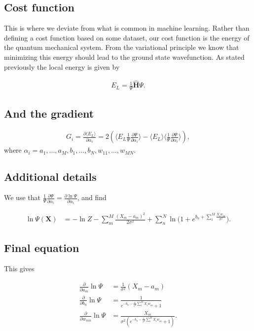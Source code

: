 \documentclass[%
oneside,                 %
final,                   %
10pt]{article}
\begin{document}
\subsection{Cost function}

This is where we deviate from what is common in machine
learning. Rather than defining a cost function based on some dataset,
our cost function is the energy of the quantum mechanical system. From
the variational principle we know that minimizing this energy should
lead to the ground state wavefunction. As stated previously the local
energy is given by

\begin{align*}
	E_L = \frac{1}{\Psi} \hat{\mathbf{H}} \Psi.
\end{align*}

\subsection{And the gradient}

\begin{align*}
	G_i = \frac{\partial \langle E_L \rangle}{\partial \alpha_i}
	= 2(\langle E_L \frac{1}{\Psi}\frac{\partial \Psi}{\partial \alpha_i} \rangle - \langle E_L \rangle \langle \frac{1}{\Psi}\frac{\partial \Psi}{\partial \alpha_i} \rangle ),
\end{align*}
where $\alpha_i = a_1,...,a_M,b_1,...,b_N,w_{11},...,w_{MN}$.

\subsection{Additional details}

We use that $\frac{1}{\Psi}\frac{\partial \Psi}{\partial \alpha_i} 
	= \frac{\partial \ln{\Psi}}{\partial \alpha_i}$,
and find

\begin{align*}
	\ln{\Psi({\mathbf{X}})} &= -\ln{Z} - \sum_m^M \frac{(X_m - a_m)^2}{2\sigma^2}
	+ \sum_n^N \ln({1 + e^{b_n + \sum_i^M \frac{X_i w_{in}}{\sigma^2}})}.
\end{align*}

\subsection{Final equation}
This gives

\begin{align*}
	\frac{\partial }{\partial a_m} \ln\Psi
	&= 	\frac{1}{\sigma^2} (X_m - a_m) \\
	\frac{\partial }{\partial b_n} \ln\Psi
	&=
	\frac{1}{e^{-b_n-\frac{1}{\sigma^2}\sum_i^M X_i w_{in}} + 1} \\
	\frac{\partial }{\partial w_{mn}} \ln\Psi
	&= \frac{X_m}{\sigma^2(e^{-b_n-\frac{1}{\sigma^2}\sum_i^M X_i w_{in}} + 1)}.
\end{align*}
\end{document}
